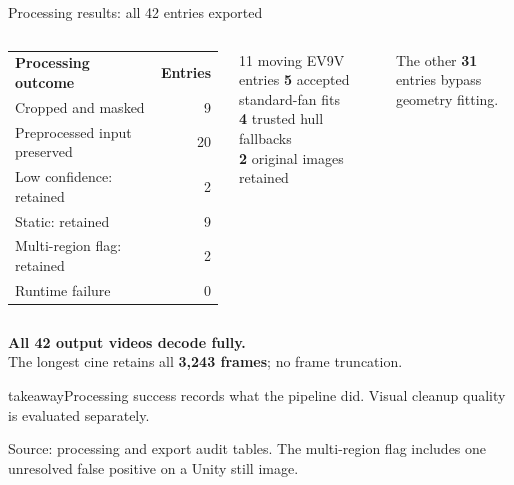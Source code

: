 \documentclass[aspectratio=169,10pt]{beamer}
\newcommand{\source}[1]{\par\vfill{\fontsize{6.1}{8}\selectfont\color{Muted}#1\par}}
\newcommand{\takeaway}[1]{\vspace{5pt}\begin{beamercolorbox}[wd=\linewidth,sep=6pt]{takeaway}\small #1\end{beamercolorbox}}
\begin{document}
\begin{frame}[t]{Processing results: all 42 entries exported}
  \begin{columns}[T,onlytextwidth]
    \small
    \begin{tabularx}{\linewidth}{@{}Y r@{}}
      \textbf{Processing outcome}&\textbf{Entries}\\
      Cropped and masked&9\\
      Preprocessed input preserved&20\\
      Low confidence: retained&2\\
      Static: retained&9\\
      Multi-region flag: retained&2\\
      Runtime failure&0\\
      \bottomrule
    \end{tabularx}
    \begin{block}{11 moving EV9V entries}
      \small\textbf{5} accepted standard-fan fits\\[4pt]
      \textbf{4} trusted hull fallbacks\\[4pt]
      \textbf{2} original images retained
    \end{block}
    \small The other \textbf{31} entries bypass geometry fitting.
  \end{columns}
  \vspace{7pt}\small
  \textbf{All 42 output videos decode fully.}\\The longest cine retains all \textbf{3,243 frames}; no frame truncation.
  \takeaway{Processing success records what the pipeline did. Visual cleanup quality is evaluated separately.}
  \source{Source: processing and export audit tables. The multi-region flag includes one unresolved false positive on a Unity still image.}
\end{frame}
\end{document}
